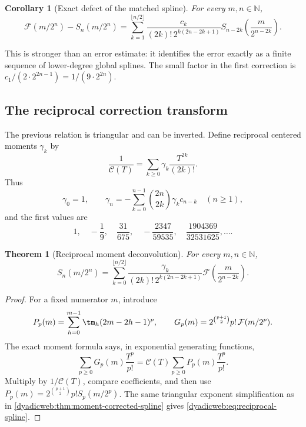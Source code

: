 \documentclass[11pt,oneside]{article}
\newtheorem{theorem}{Theorem}[section]
\newtheorem{corollary}[corollary]{Corollary}
\theoremstyle{definition}
\theoremstyle{remark}
\newcommand{\N}{\mathbb N}
\begin{document}
\begin{corollary}[Exact defect of the matched spline]
\label{dyadicweb:cor:matched-defect}
For every $m,n\in\N$,
\begin{equation}
 \mathcal F(m/2^n)-S_n(m/2^n)
 =\sum_{k=1}^{\lfloor n/2\rfloor}
 \frac{c_k}{(2k)!\,2^{k(2n-2k+1)}}
 S_{n-2k}\!\left(\frac{m}{2^{n-2k}}\right).               \label{dyadicweb:eq:matched-defect}
\end{equation}
\end{corollary}

This is stronger than an error estimate: it identifies the error exactly as a finite sequence
of lower-degree global splines.  The small factor in the first correction is
$c_1/(2\cdot2^{2n-1})=1/(9\cdot2^{2n})$.

\subsection{The reciprocal correction transform}

The previous relation is triangular and can be inverted.  Define reciprocal centered moments
$\gamma_k$ by
\begin{equation}
 \frac1{\mathscr C(T)}=
 \sum_{k\ge0}\gamma_k\frac{T^{2k}}{(2k)!}.                \label{dyadicweb:eq:gamma-def}
\end{equation}
Thus
\begin{equation}
 \gamma_0=1,
 \qquad
 \gamma_n=-\sum_{k=0}^{n-1}\binom{2n}{2k}\gamma_kc_{n-k}
 \quad(n\ge1),                                             \label{dyadicweb:eq:gamma-recurrence}
\end{equation}
and the first values are
\begin{equation}
 1,\quad-\frac19,\quad\frac{31}{675},\quad
 -\frac{2347}{59535},\quad\frac{1904369}{32531625},\ldots. \label{dyadicweb:eq:gamma-values}
\end{equation}

\begin{theorem}[Reciprocal moment deconvolution]
\label{dyadicweb:thm:reciprocal-spline}
For every $m,n\in\N$,
\begin{equation}
 \boxed{
 S_n(m/2^n)=
 \sum_{k=0}^{\lfloor n/2\rfloor}
 \frac{\gamma_k}{(2k)!\,2^{k(2n-2k+1)}}
 \mathcal F\!\left(\frac{m}{2^{n-2k}}\right).}            \label{dyadicweb:eq:reciprocal-spline}
\end{equation}
\end{theorem}

\begin{proof}
For a fixed numerator $m$, introduce
\[
 P_p(m)=\sum_{h=0}^{m-1}\tm_h(2m-2h-1)^p,
 \qquad
 G_p(m)=2^{\binom{p+1}{2}}p!\,\mathcal F(m/2^p).
\]
The exact moment formula says, in exponential generating functions,
\[
 \sum_{p\ge0}G_p(m)\frac{T^p}{p!}
 =\mathscr C(T)\sum_{p\ge0}P_p(m)\frac{T^p}{p!}.
\]
Multiply by $1/\mathscr C(T)$, compare coefficients, and then use
$P_p(m)=2^{\binom{p+1}{2}}p!S_p(m/2^p)$.  The same triangular exponent simplification as in
\cref{dyadicweb:thm:moment-corrected-spline} gives \eqref{dyadicweb:eq:reciprocal-spline}.
\end{proof}
\end{document}
